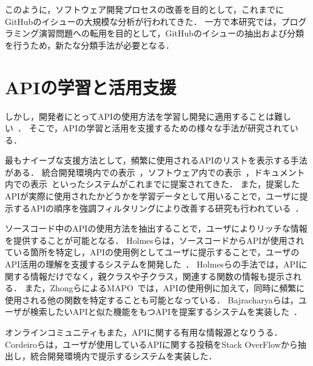このように，ソフトウェア開発プロセスの改善を目的として，これまでにGitHubのイシューの大規模な分析が行われてきた．
一方で本研究では，プログラミング演習問題への転用を目的として，GitHubのイシューの抽出および分類を行うため，新たな分類手法が必要となる．



\section{APIの学習と活用支援}

しかし，開発者にとってAPIの使用方法を学習し開発に適用することは難しい~\cite{robillard2011field}．
そこで，APIの学習と活用を支援するための様々な手法が研究されている．

最もナイーブな支援方法として，頻繁に使用されるAPIのリストを表示する手法がある．
統合開発環境内での表示~\cite{Holmes_2008_MSR_Eclipse_APIs}，ソフトウェア内での表示~\cite{UIST_2009_CommunityCommands}，ドキュメント内での表示~\cite{VLHCC_2009_API_doc_API_usage}といったシステムがこれまでに提案されてきた．
また，提案したAPIが実際に使用されたかどうかを学習データとして用いることで，ユーザに提示するAPIの順序を強調フィルタリングにより改善する研究も行われている~\cite{colab_filtering_api_recommend}．

ソースコード中のAPIの使用方法を抽出することで，ユーザによりリッチな情報を提供することが可能となる．
Holmesらは，ソースコードからAPIが使用されている箇所を特定し，APIの使用例としてユーザに提示することで，ユーザのAPI活用の理解を支援するシステムを開発した~\cite{Holmes_2006_recommend_api_example}．
Holmesらの手法では，APIに関する情報だけでなく，親クラスや子クラス，関連する関数の情報も提示される．
また，ZhongらによるMAPO~\cite{extended_MAPO}では，APIの使用例に加えて，同時に頻繁に使用される他の関数を特定することも可能となっている．
Bajracharyaらは，ユーザが検索したいAPIと似た機能をもつAPIを提案するシステムを実装した~\cite{Bajracharya:2010:LUS}．

オンラインコミュニティもまた，APIに関する有用な情報源となりうる．
Cordeiroらは，ユーザが使用しているAPIに関する投稿をStack OverFlowから抽出し，統合開発環境内で提示するシステムを実装した\cite{Cordeiro_2012_extract_QA_SO}．













